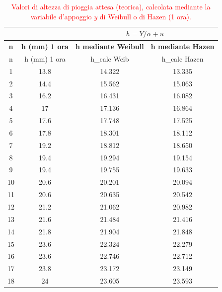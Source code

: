 \begin{table}[H] \centering
    \caption{\textcolor{red}{Valori di altezza di pioggia attesa (teorica), calcolata mediante la variabile d'appoggio $y$ di Weibull o di Hazen (1 ora).}}
    \begin{tabular}{cccc}
 & & \multicolumn{2}{c}{$h = Y/\alpha + u$}       \\
 \toprule
    \textbf{n} & \textbf{h (mm)  1 ora} & \textbf{h mediante Weibull} & \textbf{h mediante Hazen} \\
\midrule
    n         & h (mm)     1 ora & h\_calc Weib   & h\_calc Hazen  \\
    1         & 13.8             & 14.322         & 13.335         \\
    2         & 14.4             & 15.562         & 15.063         \\
    3         & 16.2             & 16.431         & 16.082         \\
    4         & 17               & 17.136         & 16.864         \\
    5         & 17.6             & 17.748         & 17.525         \\
    6         & 17.8             & 18.301         & 18.112         \\
    7         & 19.2             & 18.812         & 18.650         \\
    8         & 19.4             & 19.294         & 19.154         \\
    9         & 19.4             & 19.755         & 19.633         \\
    10        & 20.6             & 20.201         & 20.094         \\
    11        & 20.6             & 20.635         & 20.542         \\
    12        & 21.2             & 21.062         & 20.982         \\
    13        & 21.6             & 21.484         & 21.416         \\
    14        & 21.8             & 21.904         & 21.848         \\
    15        & 23.6             & 22.324         & 22.279         \\
    16        & 23.6             & 22.746         & 22.712         \\
    17        & 23.8             & 23.172         & 23.149         \\
    18        & 24               & 23.605         & 23.593         \\

\end{tabular}
\end{table}
